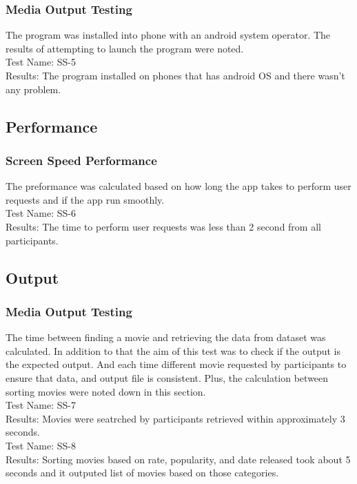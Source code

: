 \documentclass[12pt, titlepage]{article}
\begin{document}
\subsubsection{Media Output Testing}

The program was installed into phone with an android system operator. The results of attempting to launch the program were noted.\\

Test Name: SS-5\\
Results: The program installed on phones that has android OS and there wasn't any problem.
	
		
\subsection{Performance}
\subsubsection{Screen Speed Performance}
The preformance was calculated based on how long the app takes to perform user requests and if the app run smoothly.\\

Test Name: SS-6 \\
Results: The time to perform user requests was less than 2 second from all participants.

\subsection{Output}
\subsubsection{Media Output Testing}

The time between finding a movie and retrieving the data from dataset was calculated. In addition to that the aim of this test was to check if the output is the expected output. And each time different movie requested by participants to ensure that data, and output file is consistent. Plus, the calculation between sorting movies were noted down in this section.\\ 

Test Name: SS-7 \\
Results: Movies were seatrched by participants retrieved within approximately 3 seconds. \\

Test Name: SS-8 \\
Results: Sorting movies based on rate, popularity, and date released took about 5 seconds and it outputed list of movies based on those categories.
\end{document}

